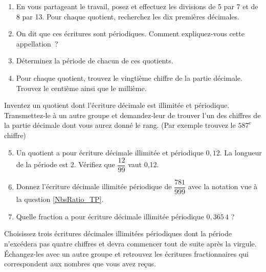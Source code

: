 
\begin{TP}

\begin{enumerate}
 \item En vous partageant le travail, posez et effectuez les divisions de 5 par 7 et de 8 par 13. Pour chaque quotient, recherchez les dix premières décimales.
 \item On dit que ces écritures sont périodiques. Comment expliquez‑vous cette appellation ?
 \item Déterminez la période de chacun de ces quotients.
 \item Pour chaque quotient, trouvez le vingtième chiffre de la partie décimale. Trouvez le centième ainsi que le millième.
 \end{enumerate}

Inventez un quotient dont l'écriture décimale est illimitée et périodique. Transmettez‑le à un autre groupe et demandez‑leur de trouver l'un des chiffres de la partie décimale dont vous aurez donné le rang. (Par exemple trouvez le $587^\text{e}$ chiffre)


\begin{enumerate}
 \setcounter{enumi}{4}
 \item Un quotient a pour écriture décimale illimitée et périodique $0,\overline{12}$. La longueur de la période est 2. Vérifiez que $\dfrac{12}{99}$ vaut 0,12. \label{NbsRatio_TP}
 \item Donnez l'écriture décimale illimitée périodique de $\dfrac{781}{999}$ avec la notation vue à la question \ref{NbsRatio_TP}.
 \item Quelle fraction a pour écriture décimale illimitée périodique $0,\overline{365\,4}$ ?
 \end{enumerate}

Choisissez trois écritures décimales illimitées périodiques dont la période n'excédera pas quatre chiffres et devra commencer tout de suite après la virgule. \\[0.5em]
Échangez‑les avec un autre groupe et retrouvez les écritures fractionnaires qui correspondent aux nombres que vous avez reçus.

\end{TP}


\vfill


